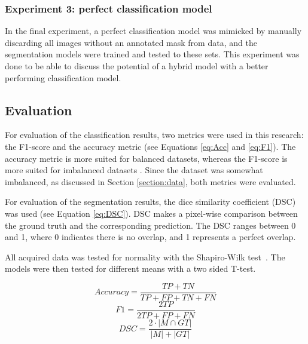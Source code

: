 \subsubsection*{Experiment 3: perfect classification model}
In the final experiment, a perfect classification model was mimicked by manually discarding all images without an annotated mask from data, and the segmentation models were trained and tested to these sets. This experiment was done to be able to discuss the potential of a hybrid model with a better performing classification model.



\subsection{Evaluation}
For evaluation of the classification results, two metrics were used in this research: the F1-score and the accuracy metric (see Equations \ref{eq:Acc} and \ref{eq:F1}). The accuracy metric is more suited for balanced datasets, whereas the F1-score is more suited for imbalanced datasets \cite{Tharwat2020}. Since the dataset was somewhat imbalanced, as discussed in Section \ref{section:data}, both metrics were evaluated.

For evaluation of the segmentation results, the dice similarity coefficient (DSC)  was used (see Equation \ref{eq:DSC}). DSC makes a pixel-wise comparison between the  ground truth and the corresponding prediction. The DSC ranges between 0 and 1, where 0 indicates there is no overlap, and 1 represents a perfect overlap.

All acquired data was tested for normality with the Shapiro-Wilk test~\cite{shapiro1965analysis}. The models were then tested for different means with a two sided T-test. 


\begin{equation}\label{eq:Acc}
    {Accuracy} = \frac{{TP} + {TN}}{{TP} + {FP} +{TN} + {FN}}
\end{equation}
\begin{equation}\label{eq:F1}
    F1 = \frac{2 {TP}}{2{TP}+{FP}+{FN}}
\end{equation}
\begin{equation}\label{eq:DSC}
    DSC = \frac{2 \cdot |M\cap GT|}{|M| + |GT|}
\end{equation}